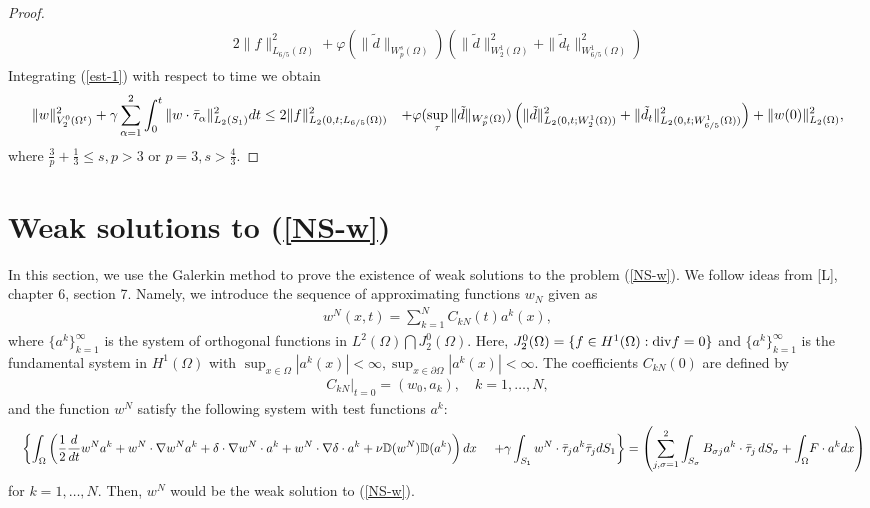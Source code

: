 \documentclass{amsart}
\theoremstyle{plain}
\begin{document}
\begin{proof}
\begin{eqnarray}
\begin{aligned}
2\|f\|_{L_{6/5}({\Omega})}^2 + {\varphi}(\|{\tilde{d}}\|_{W^s_p({\Omega})})
\left(\|{\tilde{d}}\|_{W^1_2({\Omega})}^2 + \|{\tilde{d}}_t\|_{W^1_{6/5}({\Omega})}^2\right)
\end{aligned} \end{eqnarray} Integrating (\ref{est-1}) with respect to time we obtain
\begin{eqnarray} \label{est-t} \begin{aligned} & \|w\|^2_{V^0_2({\Omega}^t)} + {\gamma}
\sum_{{\alpha}=1}^2 \int_0^t \|w\cdot\bar{\tau}_{\alpha}\|_{L_2(S_1)}^2 dt
\le 2 \|f\|^2_{L_2(0,t;L_{6/5}({\Omega}))}
{\hfil\break} &
+{\varphi}(\sup_{\tau}\|{\tilde{d}}\|_{W^s_p({\Omega})})\left(\|{\tilde{d}}\|_{L_2(0,t;W^1_2({\Omega}))}^2
+ \|{\tilde{d}}_t\|_{L_2(0,t;W^1_{6/5}({\Omega}))}^2\right)+
\|w(0)\|_{L_2({\Omega})}^2, \end{aligned} \end{eqnarray} where $\frac{3}{p} +\frac{1}{3}
\le s, p>3 $ or $p=3, s>\frac{4}{3}.$

\end{proof}

\section{Weak solutions to (\ref{NS-w})}
\setcounter{equation}{0}

In this section, we use the Galerkin method to prove the existence
of weak solutions to the problem (\ref{NS-w}). We follow ideas
from [L], chapter 6, section 7. Namely, we introduce the
sequence of approximating functions $w_N$ given as \begin{eqnarray*} w^N(x,t) = \sum_{k=1}^N C_{kN}(t) a^k(x), \end{eqnarray*} where
$\{a^k\}_{k=1}^{\infty}$ is the system of orthogonal functions in
$L^2({\Omega})\bigcap J_2^0({\Omega}).$ Here, $J^0_2({\Omega})= \{f\in H^1({\Omega}) :
{\rm div} f=0\}$ and $\{a^k\}_{k=1}^{\infty}$ is the fundamental
system in $H^1({\Omega})$ with $\sup_{x\in {\Omega}}|a^k(x)| <\infty,
\sup_{x\in {\partial}{\Omega}} |a^k(x)|<\infty.$ The coefficients $C_{kN}(0)$
are defined by \begin{eqnarray*} C_{kN}|_{t=0} = (w_0, a_k), \quad
k=1,\ldots,N, \end{eqnarray*} and the
function $w^N$ satisfy the following system with test functions $a^k$:\begin{eqnarray*} & &  \left\{ {\int_{\Omega}} \left( \frac{1}{2}\frac{d}{dt} w^N a^k + w^N\cdot{\nabla} w^N a^k+ {\delta}
\cdot {\nabla} w^N \cdot a^k + w^N \cdot{\nabla}{\delta}\cdot a^k +\nu
\mathbb{D}(w^N)\mathbb{D}(a^k)\right)dx \right.
{\hfil\break}& & \left.+ {\gamma} \int_{S_1} w^N \cdot\bar{\tau}_j a^k \bar{\tau}_j dS_1 \right \}=
\left(\sum_{j,{\sigma}=1}^2 \int_{S_{\sigma}}B_{{\sigma} j}a^k
\cdot\bar{\tau}_j\,
dS_{\sigma} + {\int_{\Omega}}  F\cdot a^k dx \right)\end{eqnarray*} for $k=1,\ldots,N.$ Then, $w^N$ would be the weak solution to
(\ref{NS-w}).
\end{document}
